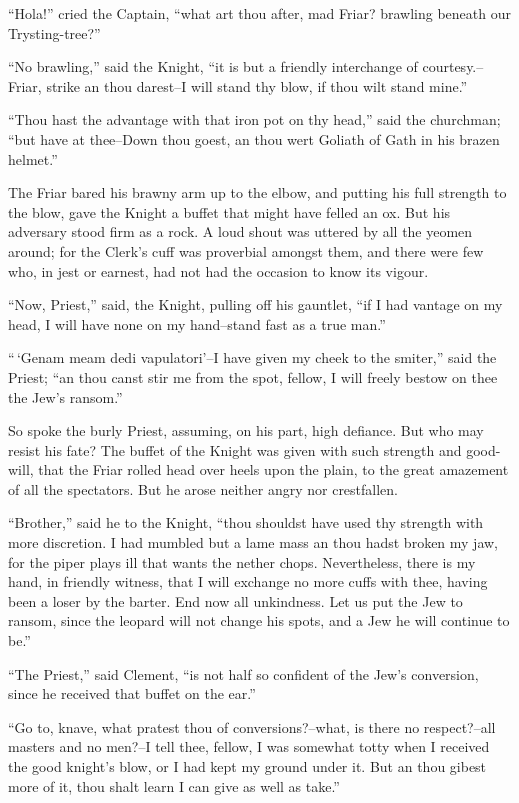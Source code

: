 ``Hola!'' cried the Captain, ``what art thou after, mad Friar? brawling
beneath our Trysting-tree?''

``No brawling,'' said the Knight, ``it is but a friendly interchange of
courtesy.--Friar, strike an thou darest--I will stand thy blow, if thou
wilt stand mine.''

``Thou hast the advantage with that iron pot on thy head,'' said the
churchman; ``but have at thee--Down thou goest, an thou wert Goliath of
Gath in his brazen helmet.''

The Friar bared his brawny arm up to the elbow, and putting his full
strength to the blow, gave the Knight a buffet that might have felled an
ox. But his adversary stood firm as a rock. A loud shout was uttered by
all the yeomen around; for the Clerk's cuff was proverbial amongst them,
and there were few who, in jest or earnest, had not had the occasion to
know its vigour.

``Now, Priest,'' said, the Knight, pulling off his gauntlet, ``if I had
vantage on my head, I will have none on my hand--stand fast as a true
man.''

``\,`Genam meam dedi vapulatori'--I have given my cheek to the smiter,''
said the Priest; ``an thou canst stir me from the spot, fellow, I will
freely bestow on thee the Jew's ransom.''

So spoke the burly Priest, assuming, on his part, high defiance. But who
may resist his fate? The buffet of the Knight was given with such
strength and good-will, that the Friar rolled head over heels upon the
plain, to the great amazement of all the spectators. But he arose
neither angry nor crestfallen.

``Brother,'' said he to the Knight, ``thou shouldst have used thy
strength with more discretion. I had mumbled but a lame mass an thou
hadst broken my jaw, for the piper plays ill that wants the nether
chops. Nevertheless, there is my hand, in friendly witness, that I will
exchange no more cuffs with thee, having been a loser by the barter. End
now all unkindness. Let us put the Jew to ransom, since the leopard will
not change his spots, and a Jew he will continue to be.''

``The Priest,'' said Clement, ``is not half so confident of the Jew's
conversion, since he received that buffet on the ear.''

``Go to, knave, what pratest thou of conversions?--what, is there no
respect?--all masters and no men?--I tell thee, fellow, I was somewhat
totty when I received the good knight's blow, or I had kept my ground
under it. But an thou gibest more of it, thou shalt learn I can give as
well as take.''

